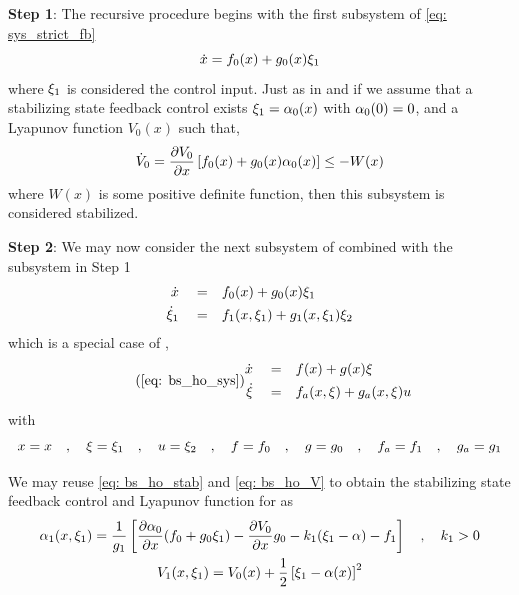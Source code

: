 \documentclass[12pt]{ucthesis}
\begin{document}
\noindent \textbf{Step 1}: The recursive procedure begins with the first subsystem of \ref{eq: sys_strict_fb}
	\begin{equation} \label{eq: bs_ho_x1}
		\dot{x} =  f_0(x) +	g_0(x)\xi_1  
	\end{equation}
where $\xi_1$ is considered the control input. Just as in  and  if we assume that a stabilizing state feedback control exists $\xi_1 = \alpha_0(x)$ with $\alpha_0(0)=0$, and a Lyapunov function $V_0(x)$ such that,
	\begin{equation} \label{eq: bs_ho_V1}
		\dot{V}_0 = \frac{\partial V_0}{\partial x}\left[ f_0(x) + g_0(x)\alpha_0(x) \right] \leq -W(x) 
	\end{equation}
where $W(x)$ is some positive definite function, then this subsystem is considered stabilized.

\noindent \textbf{Step 2}: We may now consider the next subsystem of  combined with the subsystem in Step 1
	\begin{equation} \label{eq: bs_ho_x2}
		\begin{aligned}
			\dot{x} 		\quad=&\quad f_0(x) + g_0(x)\xi_1 \\
			\dot{\xi}_1 	\quad=&\quad f_1(x,\xi_1) + g_1(x,\xi_1)\xi_2
		\end{aligned}
	\end{equation}
which is a special case of ,
	\begin{equation} \tag{\ref{eq: bs_ho_sys}}
		\begin{aligned}
			\dot{x} 	\quad=&\quad f(x)+g(x)\virt 			\\
			\dot{\virt} \quad=&\quad f_a(x,\virt)+g_a(x,\virt)u
		\end{aligned}
	\end{equation}
with 
	\begin{equation*} 
		x = x \quad,\quad \xi = \xi_1 \quad,\quad u=\xi_2 \quad,\quad f = f_0 \quad,\quad g = g_0 \quad,\quad f_a = f_1 \quad,\quad g_a = g_1
	\end{equation*}

We may reuse \ref{eq: bs_ho_stab} and \ref{eq: bs_ho_V} to obtain the stabilizing state feedback control and Lyapunov function for  as
	\begin{gather} \label{eq: bs_ho_u2}
		\alpha_1(x,\xi_1) = \frac{1}{g_1} \left[  \frac{\partial\alpha_0}{\partial x} (f_0+g_0\xi_1) - \frac{\partial V_0}{\partial x}g_0 - k_1(\xi_1 - \alpha) - f_1 \right]  \quad,\quad k_1>0 \\
		V_1(x,\xi_1) = V_0(x) + \frac{1}{2}\left[ \xi_1 - \alpha(x) \right]^2 
	\end{gather}
\end{document}
